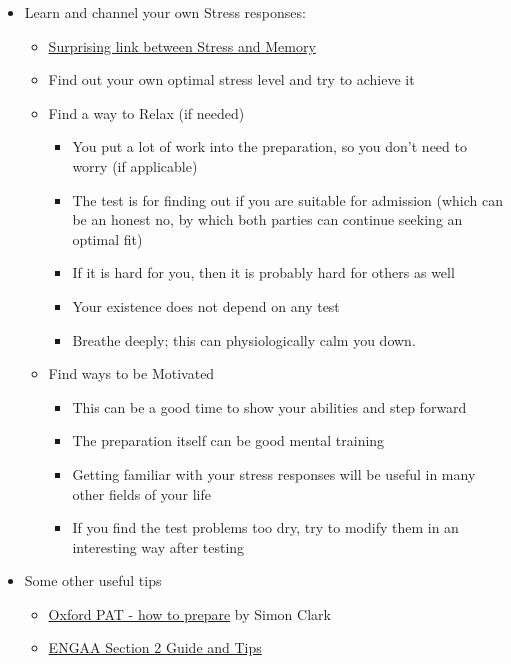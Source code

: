 \documentclass{article}
\begin{document}
\begin{itemize}
    \item Learn and channel your own Stress responses:
    \begin{itemize}
        \item \href{https://www.ted.com/talks/elizabeth_cox_the_surprising_link_between_stress_and_memory}{Surprising link between Stress and Memory}
        \item Find out your own optimal stress level and try to achieve it
        \item Find a way to Relax (if needed)
        \begin{itemize}
            \item You put a lot of work into the preparation, so you don't need to worry (if applicable)
            \item The test is for finding out if you are suitable for admission (which can be an honest no, by which both parties can continue seeking an optimal fit)
            \item If it is hard for you, then it is probably hard for others as well
            \item Your existence does not depend on any test
            \item Breathe deeply; this can physiologically calm you down.
        \end{itemize}
        \item Find ways to be Motivated
        \begin{itemize}
            \item This can be a good time to show your abilities and step forward
            \item The preparation itself can be good mental training
            \item Getting familiar with your stress responses will be useful in many other fields of your life
            \item If you find the test problems too dry, try to modify them in an interesting way after testing
        \end{itemize}
    \end{itemize}
    \item Some other useful tips
    \begin{itemize}
        \item \href{https://www.youtube.com/watch?v=gRk3fxsjrpE}{Oxford PAT - how to prepare} by Simon Clark
        \item \href{https://www.uniadmissions.co.uk/engaa/guides/engaa-section-2-guide-and-tips/}{ENGAA Section 2 Guide and Tips}
    \end{itemize}
\end{itemize}
\end{document}

